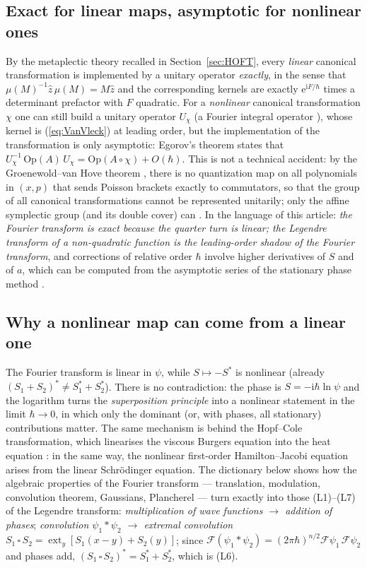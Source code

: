 \documentclass[11pt,a4paper]{article}
\newcommand{\ii}{\mathrm{i}}
\newcommand{\ee}{\mathrm{e}}
\newcommand{\hb}{\hbar}
\newcommand{\op}[1]{\hat{#1}}
\newcommand{\ext}{\operatorname*{ext}}
\newcommand{\FT}{\mathcal{F}}
\theoremstyle{plain}
\theoremstyle{definition}
\theoremstyle{remark}
\begin{document}
\subsection{Exact for linear maps, asymptotic for nonlinear ones}

By the metaplectic theory recalled in Section~\ref{sec:HOFT}, every \emph{linear} canonical transformation is implemented by a unitary operator \emph{exactly}, in the sense that $\mu(M)^{-1}\op z\,\mu(M)=M\op z$ and the corresponding kernels are exactly $\ee^{\ii F/\hb}$ times a determinant prefactor with $F$ quadratic. For a \emph{nonlinear} canonical transformation $\chi$ one can still build a unitary operator $U_\chi$ (a Fourier integral operator \cite{Hormander2}), whose kernel is (\ref{eq:VanVleck}) at leading order, but the implementation of the transformation is only asymptotic: Egorov's theorem \cite{Egorov} states that $U_\chi^{-1}\,\mathrm{Op}(A)\,U_\chi=\mathrm{Op}(A\circ\chi)+O(\hb)$. This is not a technical accident: by the Groenewold--van Hove theorem \cite{Groenewold}, there is no quantization map on all polynomials in $(x,p)$ that sends Poisson brackets exactly to commutators, so that the group of all canonical transformations cannot be represented unitarily; only the affine symplectic group (and its double cover) can \cite{Folland,deGosson2}. In the language of this article: \emph{the Fourier transform is exact because the quarter turn is linear; the Legendre transform of a non-quadratic function is the leading-order shadow of the Fourier transform}, and corrections of relative order $\hb$ involve higher derivatives of $S$ and of $a$, which can be computed from the asymptotic series of the stationary phase method \cite{Hormander1,Wong,Stein}.

\subsection{Why a nonlinear map can come from a linear one}

The Fourier transform is linear in $\psi$, while $S\mapsto-S^*$ is nonlinear (already $(S_1+S_2)^*\neq S_1^*+S_2^*$). There is no contradiction: the phase is $S=-\ii\hb\ln\psi$ and the logarithm turns the \emph{superposition principle} into a nonlinear statement in the limit $\hb\to0$, in which only the dominant (or, with phases, all stationary) contributions matter. The same mechanism is behind the Hopf--Cole transformation, which linearises the viscous Burgers equation into the heat equation \cite{Hopf,Cole}: in the same way, the nonlinear first-order Hamilton--Jacobi equation arises from the linear Schr\"odinger equation. The dictionary below shows how the algebraic properties of the Fourier transform --- translation, modulation, convolution theorem, Gaussians, Plancherel --- turn exactly into those (L1)--(L7) of the Legendre transform:
\emph{multiplication of wave functions $\to$ addition of phases}; \emph{convolution $\psi_1*\psi_2$ $\to$ extremal convolution $S_1\,\square\,S_2=\ext_y[S_1(x-y)+S_2(y)]$}; since $\FT(\psi_1*\psi_2)=(2\pi\hb)^{n/2}\FT\psi_1\,\FT\psi_2$ and phases add, $(S_1\,\square\,S_2)^*=S_1^*+S_2^*$, which is (L6).
\end{document}

